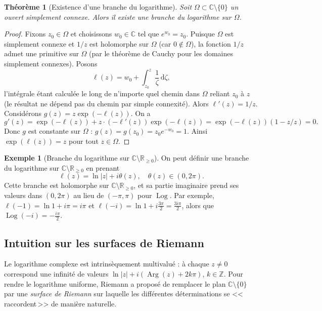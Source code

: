 \documentclass[12pt,a4paper,openany]{book}
\theoremstyle{definition}
\newtheorem{exemple}[definition]{Exemple}
\theoremstyle{plain}
\newtheorem{theoreme}[definition]{Théorème}
\theoremstyle{remark}
\newcommand{\C}{\mathbb{C}}
\newcommand{\R}{\mathbb{R}}
\newcommand{\Z}{\mathbb{Z}}
\DeclareMathOperator{\Arg}{Arg}
\DeclareMathOperator{\Log}{Log}
\newcommand{\dd}{\mathrm{d}}
\newcommand{\abs}[1]{\left|#1\right|}
\begin{document}
\begin{theoreme}[Existence d'une branche du logarithme]\label{thm:existence-branche-log}
Soit $\Omega \subset \C \setminus \{0\}$ un ouvert simplement connexe. Alors il existe une branche du logarithme sur $\Omega$.
\end{theoreme}

\begin{proof}
Fixons $z_0 \in \Omega$ et choisissons $w_0 \in \C$ tel que $e^{w_0} = z_0$. Puisque $\Omega$ est simplement connexe et $1/z$ est holomorphe sur $\Omega$ (car $0 \notin \Omega$), la fonction $1/z$ admet une primitive sur $\Omega$ (par le théorème de Cauchy pour les domaines simplement connexes). Posons
\[
  \ell(z) = w_0 + \int_{z_0}^{z} \frac{1}{\zeta}\,\dd\zeta,
\]
l'intégrale étant calculée le long de n'importe quel chemin dans $\Omega$ reliant $z_0$ à $z$ (le résultat ne dépend pas du chemin par simple connexité). Alors $\ell'(z) = 1/z$. Considérons $g(z) = z \exp(-\ell(z))$. On a
\[
  g'(z) = \exp(-\ell(z)) + z \cdot (-\ell'(z)) \exp(-\ell(z))
         = \exp(-\ell(z))(1 - z/z) = 0.
\]
Donc $g$ est constante sur $\Omega$ : $g(z) = g(z_0) = z_0 e^{-w_0} = 1$. Ainsi $\exp(\ell(z)) = z$ pour tout $z \in \Omega$.
\end{proof}

\begin{exemple}[Branche du logarithme sur $\C \setminus \R_{\geq 0}$]\label{ex:branche-log-coupe-positive}
On peut définir une branche du logarithme sur $\C \setminus \R_{\geq 0}$ en prenant
\[
  \ell(z) = \ln\abs{z} + i\theta(z), \quad \theta(z) \in (0, 2\pi).
\]
Cette branche est holomorphe sur $\C \setminus \R_{\geq 0}$, et sa partie imaginaire prend ses valeurs dans $(0, 2\pi)$ au lieu de $(-\pi, \pi)$ pour $\Log$.
Par exemple, $\ell(-1) = \ln 1 + i\pi = i\pi$ et $\ell(-i) = \ln 1 + i\frac{3\pi}{2} = \frac{3i\pi}{2}$, alors que $\Log(-i) = -\frac{i\pi}{2}$.
\end{exemple}

\subsection{Intuition sur les surfaces de Riemann}\label{subsec:surface-riemann-log}

Le logarithme complexe est intrinsèquement multivalué : à chaque $z \neq 0$ correspond une infinité de valeurs $\ln\abs{z} + i(\Arg(z) + 2k\pi)$, $k \in \Z$. Pour rendre le logarithme uniforme, Riemann a proposé de remplacer le plan $\C \setminus \{0\}$ par une \emph{surface de Riemann} sur laquelle les différentes déterminations se <<\,raccordent\,>> de manière naturelle.
\end{document}
